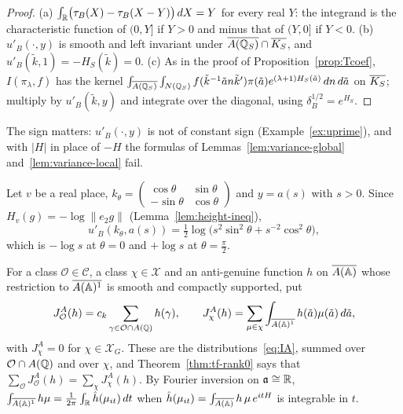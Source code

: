\begin{proof}
(a) $\int_{\mathbb{R}}\bigl(\tau_B(X)-\tau_B(X-Y)\bigr)\,dX=Y$ for every real $Y$:
the integrand is the characteristic function of $(0,Y]$ if $Y>0$ and
minus that of $(Y,0]$ if $Y<0$. (b) $u'_B(\cdot,y)$ is smooth and left
invariant under $\overline{A(\mathbb{Q}_S)}\cap\overline{K_S}$, and $u'_B(\tilde k,1)=-H_S(\tilde k)=0$.
(c) As in the proof of Proposition~\ref{prop:Tcoef}, $I(\pi_\lambda,f)$
has the kernel $\int_{\overline{A(\mathbb{Q}_S)}}\int_{N(\mathbb{Q}_S)}f(\tilde k^{-1}\tilde
an\tilde k')\pi(\tilde a)e^{(\lambda+1)H_S(\tilde a)}\,dn\,d\tilde a$ on
$\overline{K_S}$; multiply by $u'_B(\tilde k,y)$ and integrate over the diagonal,
using $\delta_B^{1/2}=e^{H_S}$.
\end{proof}

The sign matters: $u'_B(\cdot,y)$ is not of constant sign
(Example~\ref{ex:uprime}), and with $|H|$ in place of $-H$ the formulas of
Lemmas~\ref{lem:variance-global} and~\ref{lem:variance-local} fail.

\begin{example}\label{ex:uprime}
Let $v$ be a real place, $k_\theta=\begin{pmatrix}\cos\theta&\sin\theta\\
-\sin\theta&\cos\theta\end{pmatrix}$ and $y=a(s)$ with $s>0$. Since
$H_v(g)=-\log\|e_2g\|$ (Lemma~\ref{lem:height-ineq}),
\[
u'_B(k_\theta,a(s))=\tfrac12\log\bigl(s^2\sin^2\theta+s^{-2}\cos^2\theta
\bigr),
\]
which is $-\log s$ at $\theta=0$ and $+\log s$ at $\theta=\frac\pi2$.
\end{example}

For a class $\mathcal O\in\mathcal C$, a class $\chi\in\mathcal X$ and an
anti-genuine function $h$ on $\overline{A(\mathbb{A})}$ whose restriction to
$\overline{A(\mathbb{A})^1}$ is smooth and compactly supported, put
\begin{equation}\label{eq:JAo}
J^A_{\mathcal O}(h)=c_k\sum_{\gamma\in\mathcal O\cap A(\mathbb{Q})}h(\gamma),\qquad
J^A_\chi(h)=\sum_{\mu\in\chi}\int_{\overline{A(\mathbb{A})^1}}h(\tilde a)\mu(\tilde
a)\,d\tilde a,
\end{equation}
with $J^A_\chi=0$ for $\chi\in\mathcal X_G$. These are the
distributions~\eqref{eq:IA}, summed over $\mathcal O\cap A(\mathbb{Q})$ and over
$\chi$, and Theorem~\ref{thm:tf-rank0} says that
$\sum_{\mathcal O}J^A_{\mathcal O}(h)=\sum_\chi J^A_\chi(h)$. By Fourier
inversion on $\mathfrak a\cong\mathbb{R}$, $\int_{\overline{A(\mathbb{A})^1}}h\mu=\frac1{2\pi}
\int_{\mathbb{R}}\hat h(\mu_{it})\,dt$ when $\hat h(\mu_{it})=\int_{\overline{A(\mathbb{A})}}
h\,\mu\,e^{itH}$ is integrable in $t$.

